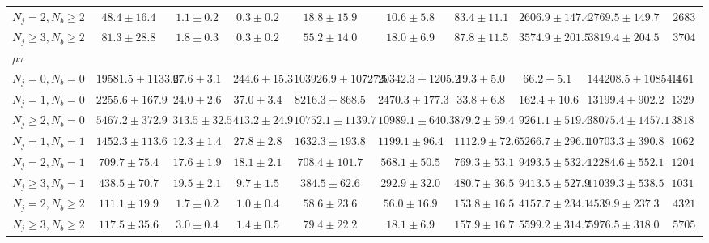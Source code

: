 \begin{sidewaystable}[]
{\begin{tabular}{l|ccccccc|cc}
        $N_{j} = 2, N_{b} \geq 2$       & $48.4 \pm 16.4$      & $1.1 \pm 0.2$    & $0.3 \pm 0.2$    & $18.8 \pm 15.9$        & $10.6 \pm 5.8$       & $83.4 \pm 11.1$   & $2606.9 \pm 147.4$ & $2769.5 \pm 149.7$     & $2683$   \\
        $N_{j} \geq 3, N_{b} \geq 2$    & $81.3 \pm 28.8$      & $1.8 \pm 0.3$    & $0.3 \pm 0.2$    & $55.2 \pm 14.0$        & $18.0 \pm 6.9$       & $87.8 \pm 11.5$   & $3574.9 \pm 201.5$ & $3819.4 \pm 204.5$     & $3704$   \\
        \hline
        \multicolumn{10}{l}{$\mu\tau$} \\
        \hline
        $N_{j} = 0, N_{b} = 0$          & $19581.5 \pm 1133.6$ & $27.6 \pm 3.1$   & $244.6 \pm 15.3$ & $103926.9 \pm 10727.5$ & $20342.3 \pm 1205.2$ & $19.3 \pm 5.0$    & $66.2 \pm 5.1$     & $144208.5 \pm 10854.4$ & $146128$ \\
        $N_{j} = 1, N_{b} = 0$          & $2255.6 \pm 167.9$   & $24.0 \pm 2.6$   & $37.0 \pm 3.4$   & $8216.3 \pm 868.5$     & $2470.3 \pm 177.3$   & $33.8 \pm 6.8$    & $162.4 \pm 10.6$   & $13199.4 \pm 902.2$    & $13293$  \\
        $N_{j} \geq 2, N_{b} = 0$       & $5467.2 \pm 372.9$   & $313.5 \pm 32.5$ & $413.2 \pm 24.9$ & $10752.1 \pm 1139.7$   & $10989.1 \pm 640.3$  & $879.2 \pm 59.4$  & $9261.1 \pm 519.4$ & $38075.4 \pm 1457.1$   & $38184$  \\
        $N_{j} = 1, N_{b} = 1$          & $1452.3 \pm 113.6$   & $12.3 \pm 1.4$   & $27.8 \pm 2.8$   & $1632.3 \pm 193.8$     & $1199.1 \pm 96.4$    & $1112.9 \pm 72.6$ & $5266.7 \pm 296.1$ & $10703.3 \pm 390.8$    & $10628$  \\
        $N_{j} = 2, N_{b} = 1$          & $709.7 \pm 75.4$     & $17.6 \pm 1.9$   & $18.1 \pm 2.1$   & $708.4 \pm 101.7$      & $568.1 \pm 50.5$     & $769.3 \pm 53.1$  & $9493.5 \pm 532.4$ & $12284.6 \pm 552.1$    & $12048$  \\
        $N_{j} \geq 3, N_{b} = 1$       & $438.5 \pm 70.7$     & $19.5 \pm 2.1$   & $9.7 \pm 1.5$    & $384.5 \pm 62.6$       & $292.9 \pm 32.0$     & $480.7 \pm 36.5$  & $9413.5 \pm 527.9$ & $11039.3 \pm 538.5$    & $10314$  \\
        $N_{j} = 2, N_{b} \geq 2$       & $111.1 \pm 19.9$     & $1.7 \pm 0.2$    & $1.0 \pm 0.4$    & $58.6 \pm 23.6$        & $56.0 \pm 16.9$      & $153.8 \pm 16.5$  & $4157.7 \pm 234.1$ & $4539.9 \pm 237.3$     & $4321$   \\
        $N_{j} \geq 3, N_{b} \geq 2$    & $117.5 \pm 35.6$     & $3.0 \pm 0.4$    & $1.4 \pm 0.5$    & $79.4 \pm 22.2$        & $18.1 \pm 6.9$       & $157.9 \pm 16.7$  & $5599.2 \pm 314.7$ & $5976.5 \pm 318.0$     & $5705$   \\
        \hline
    \end{tabular}}

    \label{tab:analysis:selection:yieldsShape2}
\end{sidewaystable}

